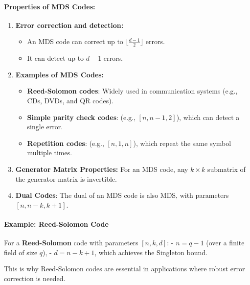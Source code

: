 \documentclass[11pt]{article}
\providecommand{\tightlist}{%
      \setlength{\itemsep}{0pt}\setlength{\parskip}{0pt}}
\begin{document}
\paragraph{\texorpdfstring{\textbf{Properties of MDS
Codes:}}{Properties of MDS Codes:}}\label{properties-of-mds-codes}

\begin{enumerate}
\def\labelenumi{\arabic{enumi}.}
\item
  \textbf{Error correction and detection:}

  \begin{itemize}
  \tightlist
  \item
    An MDS code can correct up to \(\lfloor \frac{d - 1}{2} \rfloor\)
    errors.
  \item
    It can detect up to \(d - 1\) errors.
  \end{itemize}
\item
  \textbf{Examples of MDS Codes:}

  \begin{itemize}
  \tightlist
  \item
    \textbf{Reed-Solomon codes}: Widely used in communication systems
    (e.g., CDs, DVDs, and QR codes).
  \item
    \textbf{Simple parity check codes}: (e.g., \([n, n-1, 2]\)), which
    can detect a single error.
  \item
    \textbf{Repetition codes}: (e.g., \([n, 1, n]\)), which repeat the
    same symbol multiple times.
  \end{itemize}
\item
  \textbf{Generator Matrix Properties:} For an MDS code, any
  \(k \times k\) submatrix of the generator matrix is invertible.
\item
  \textbf{Dual Codes}: The dual of an MDS code is also MDS, with
  parameters \([n, n-k, k+1]\).
\end{enumerate}

\paragraph{\texorpdfstring{\textbf{Example: Reed-Solomon
Code}}{Example: Reed-Solomon Code}}\label{example-reed-solomon-code}

For a \textbf{Reed-Solomon} code with parameters \([n, k, d]\): -
\(n = q - 1\) (over a finite field of size \(q\)), - \(d = n - k + 1\),
which achieves the Singleton bound.

This is why Reed-Solomon codes are essential in applications where
robust error correction is needed.
\end{document}
